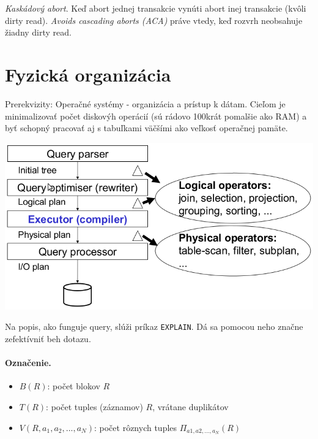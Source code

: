\documentclass[10pt,a4paper]{article}
\begin{document}
\emph{Kaskádový abort}. Keď abort jednej transakcie vynúti abort inej transakcie (kvôli dirty read).
\emph{Avoids cascading aborts (ACA)} práve vtedy, keď rozvrh neobsahuje žiadny dirty read. 
    

\section{Fyzická organizácia} 
\label{fyzicka_organizacia}

Prerekvizity: Operačné systémy - organizácia a prístup k dátam.
Cieľom je minimalizovať počet diskovýh operácií (sú rádovo 100krát pomalšie ako RAM)
a byť schopný pracovať aj s tabuľkami väčšími ako veľkosť operačnej pamäte. 

\begin{center}
\includegraphics[scale=0.5]{db_fyzicky_model.png}
\end{center}

Na popis, ako funguje query, slúži príkaz \verb|EXPLAIN|. Dá sa pomocou neho značne zefektívniť beh dotazu. 

\paragraph{Označenie.}
\begin{itemize}
\item $B(R)$: počet blokov $R$
\item $T(R)$: počet tuples (záznamov) $R$, vrátane duplikátov
\item $V(R, a_1, a_2, ..., a_N)$: počet rôznych tuples $\Pi_{a1, a2, \ldots, a_N}(R)$
\end{itemize}
\end{document}
